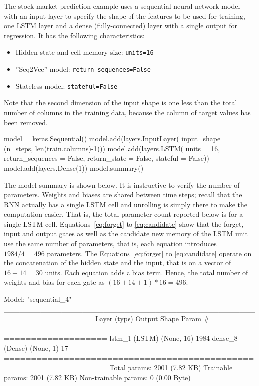 The stock market prediction example uses a sequential neural network model with an input layer to specify the shape of the features to be used for training, one LSTM layer and a dense (fully-connected) layer with a single output for regression. It has the following characteristics:

\begin{itemize}
   \item Hidden state and cell memory size: \texttt{units=16}
   \item ''Seq2Vec'' model: \texttt{return\_sequences=False}
   \item Stateless model: \texttt{stateful=False}
\end{itemize}

Note that the second dimension of the input shape is one less than the total number of columns in the training data, because the column of target values has been removed.

\begin{samepage}
\begin{pythoncode}
model = keras.Sequential()
model.add(layers.InputLayer(
    input_shape = (n_steps, len(train.columns)-1)))
model.add(layers.LSTM(
    units = 16,
    return_sequences = False,
    return_state = False,
    stateful = False))
model.add(layers.Dense(1))
model.summary()
\end{pythoncode}
\end{samepage}

The model summary is shown below. It is instructive to verify the number of parameters. Weights and biases are shared between time steps; recall that the RNN actually has a single LSTM cell and unrolling is simply there to make the computation easier. That is, the total parameter count reported below is for a single LSTM cell. Equations~\ref{eq:forget} to \ref{eq:candidate} show that the forget, input and output gates as well as the candidate new memory of the LSTM unit use the same number of parameters, that is, each equation introduces $1984/4 = 496$ parameters. The Equations~\ref{eq:forget} to \ref{eq:candidate} operate on the concatenation of the hidden state and the input, that is on a vector of $16 + 14 = 30$ units. Each equation adds a bias term. Hence, the total number of weights and bias for each gate as $(16 + 14 + 1) * 16 = 496$.

\begin{samepage}
\begin{textcode}
Model: "sequential_4"
_________________________________________________________________
 Layer (type)                Output Shape              Param #   
=================================================================
 lstm_1 (LSTM)               (None, 16)                1984      
 dense_8 (Dense)             (None, 1)                 17        
=================================================================
Total params: 2001 (7.82 KB)
Trainable params: 2001 (7.82 KB)
Non-trainable params: 0 (0.00 Byte)
\end{textcode}
\end{samepage}

